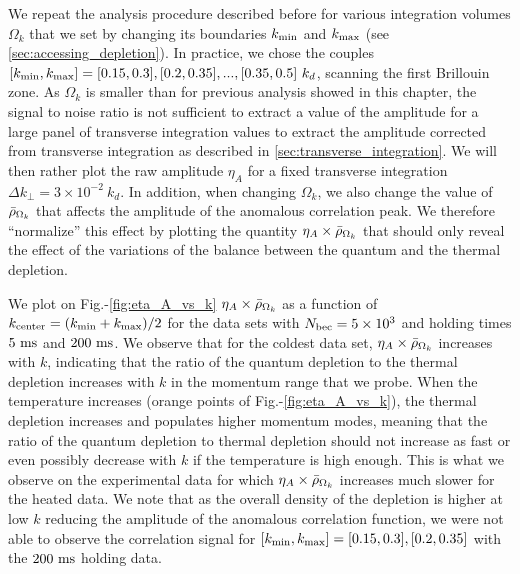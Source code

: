 We repeat the analysis procedure described before for various integration volumes $\Omega_k$ that we set by changing its boundaries $k_{\rm{min}}$ and $k_{\rm{max}}$ (see \ref{sec:accessing_depletion}). In practice, we chose the couples $[k_{\rm{min}},k_{\rm{max}}]=[0.15,0.3],[0.2,0.35],...,[0.35,0.5] \ k_d$, scanning the first Brillouin zone. As $\Omega_k$ is smaller than for previous analysis showed in this chapter, the signal to noise ratio is not sufficient to extract a value of the amplitude for a large panel of transverse integration values to extract the amplitude corrected from transverse integration as described in \ref{sec:transverse_integration}. We will then rather plot the raw amplitude $\eta_A$ for a fixed transverse integration $\Delta k_{\perp}=3 \times 10^{-2} \ k_d$. In addition, when changing $\Omega_k$, we also change the value of $\bar{\rho}_{\Omega_k}$ that affects the amplitude of the anomalous correlation peak. We therefore ``normalize'' this effect by plotting the quantity $\eta_A \times \bar{\rho}_{\Omega_k}$ that should only reveal the effect of the variations of the balance between the quantum and the thermal depletion.

We plot on Fig.-\ref{fig:eta_A_vs_k} $\eta_A \times \bar{\rho}_{\Omega_k}$ as a function of $k_{\rm{center}}=(k_{\rm{min}}+k_{\rm{max}})/2$ for the data sets with $N_{\rm{bec}}= 5 \times 10^3$ and holding times $5 \ \rm{ms}$ and $200 \ \rm{ms}$. We observe that for the coldest data set, $\eta_A \times \bar{\rho}_{\Omega_k}$ increases with $k$, indicating that the ratio of the quantum depletion to the thermal depletion increases with $k$ in the momentum range that we probe. When the temperature increases (orange points of Fig.-\ref{fig:eta_A_vs_k}), the thermal depletion increases and populates higher momentum modes, meaning that the ratio of the quantum depletion to thermal depletion should not increase as fast or even possibly decrease with $k$ if the temperature is high enough. This is what we observe on the experimental data for which $\eta_A \times \bar{\rho}_{\Omega_k}$ increases much slower for the heated data. We note that as the overall density of the depletion is higher at low $k$ reducing the amplitude of the anomalous correlation function, we were not able to observe the correlation signal for $[k_{\rm{min}},k_{\rm{max}}]=[0.15,0.3],[0.2,0.35]$ with the $200 \ \rm{ms}$ holding data.

